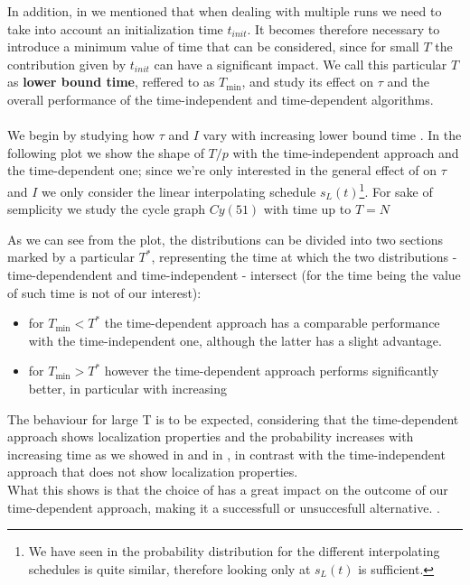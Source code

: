         \noindent
        In addition, in   we mentioned that when dealing with multiple runs we need to take into account an initialization time $t_{init}$. It becomes therefore necessary to introduce a minimum value of time that can be considered, since for small $T$ the contribution given by $t_{init}$ can have a significant impact. We call this particular $T$ as \textbf{lower bound time}, reffered to as $T_{\min}$, and study its effect on $\tau$ and the overall performance of the time-independent and time-dependent algorithms. \\ \\

         We begin by studying how $\tau$ and $I$ vary with increasing lower bound time \tmin.
         In the following plot we show the shape of $T/p$ with the time-independent approach and the time-dependent one; since we're only interested in the general effect of \tmin on $\tau$ and $I$ we only consider the linear interpolating schedule $s_L(t)$\footnote{We have seen in  the probability distribution for the different interpolating schedules is quite similar, therefore looking only at $s_L(t)$ is sufficient.}. For sake of semplicity we study the cycle graph $Cy(51)$ with time up to $T=N$\\

        As we can see from the plot, the distributions can be divided into two sections marked by a particular $T^*$, representing the time at which the two distributions - time-dependendent and time-independent - intersect (for the time being the value of such time is not of our interest):
        \begin{itemize}
            \item for $T_{\min}<T^*$ the time-dependent approach has a comparable performance with the time-independent one, although the latter has a slight advantage.
            \item for $T_{\min}>T^*$ however the time-dependent approach performs significantly better, in particular with increasing \tmin
        \end{itemize}
        The behaviour for large T is to be expected, considering that the time-dependent approach shows localization properties and the probability increases with increasing time as we showed in  and in , in contrast with the time-independent approach that does not show localization properties.\\ What this shows is that the choice of \tmin has a great impact on the outcome of our time-dependent approach, making it a successfull or unsuccesfull alternative. .\\

